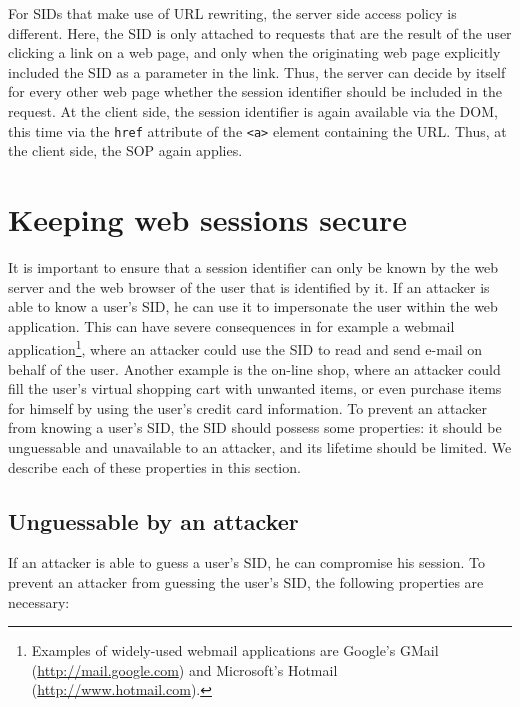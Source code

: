 For SIDs that make use of URL rewriting, the server side access policy is different. Here, the SID is only attached to requests that are the result of the user clicking a link on a web page, and only when the originating web page explicitly included the SID as a parameter in the link. Thus, the server can decide by itself for every other web page whether the session identifier should be included in the request. At the client side, the session identifier is again available via the DOM, this time via the \texttt{href} attribute of the \texttt{<a>} element containing the URL. Thus, at the client side, the SOP again applies.

\section{Keeping web sessions secure}\label{secure-sessions}

It is important to ensure that a session identifier can only be known by the web server and the web browser of the user that is identified by it. If an attacker is able to know a user's SID, he can use it to impersonate the user within the web application. This can have severe consequences in for example a webmail application\footnote{Examples of widely-used webmail applications are Google's GMail (\url{http://mail.google.com}) and Microsoft's Hotmail (\url{http://www.hotmail.com}).}, where an attacker could use the SID to read and send e-mail on behalf of the user. Another example is the on-line shop, where an attacker could fill the user's virtual shopping cart with unwanted items, or even purchase items for himself by using the user's credit card information. To prevent an attacker from knowing a user's SID, the SID should possess some properties: it should be unguessable and unavailable to an attacker, and its lifetime should be limited. We describe each of these properties in this section.

\subsection{Unguessable by an attacker}\label{unguessable}

If an attacker is able to guess a user's SID, he can compromise his session. To prevent an attacker from guessing the user's SID, the following properties are necessary:

